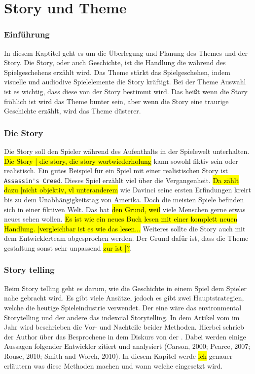 \pagebreak
{}
\chapter {Story und Theme}

\subsection{Einführung}
In diesem Kaptitel geht es um die Überlegung und Planung des Themes und der Story. Die Story, oder auch Geschichte, ist die Handlung die während des Spielgeschehens erzählt wird. Das Theme stärkt das Spielgeschehen, indem visuelle und audiodive Spielelemente die Story kräftigt. Bei der Theme Auswahl ist es wichtig, dass diese von der Story bestimmt wird. Das heißt wenn die Story fröhlich ist wird das Theme bunter sein, aber wenn die Story eine traurige Geschichte erzählt, wird das Theme düsterer. 

\subsection{Die Story}
Die Story soll den Spieler während des Aufenthalts in der Spielewelt unterhalten. \hl{Die Story | die story, die story wortwiederholung} kann sowohl fiktiv sein oder realistisch. Ein gutes Beispiel für ein Spiel mit einer realistischen Story ist \verb+Assassin's Creed+. Dieses Spiel erzählt viel über die Vergangenheit. \hl{Da zählt dazu |nicht objektiv, vl unteranderem} wie Davinci seine ersten Erfindungen kreirt bis zu dem Unabhängigkeitstag von Amerika. Doch die meisten Spiele befinden sich in einer fiktiven Welt. Das hat \hl{den Grund, weil} viele Menschen gerne etwas neues sehen wollen. \hl{Es ist wie ein neues Buch lesen mit einer komplett neuen Handlung. |vergleichbar ist es wie das lesen...} Weiteres sollte die Story auch mit dem Entwicklerteam abgesprochen werden. Der Grund dafür ist, dass die Theme gestaltung sonst sehr unpassend \hl{zur ist |?}. 



\subsection{Story telling}

Beim Story telling geht es darum, wie die Geschichte in einem Spiel dem Spieler nahe gebracht wird. Es gibt viele Ansätze, jedoch es gibt zwei Hauptstrategien, welche die heutige Spieleindustrie verwendet. Der eine wäre das environmental Storytelling und der andere das indexcial Storytelling. In dem Artikel  vom \citeauthor{Fernadez1} im Jahr \citeyear{Fernadez1} wird beschrieben die Vor- und Nachteile beider Methoden. Hierbei schrieb der Author \citeauthor{Fernadez1} über das Besprochene in dem Diskurs von der . Dabei werden einige Aussagen folgender Entwickler zitiert und analysiert (Carson, 2000; Pearce, 2007; Rouse, 2010; Smith and Worch, 2010). In diesem Kapitel werde \hl{ich} genauer erläutern was diese Methoden machen und wann welche eingesetzt wird. 

